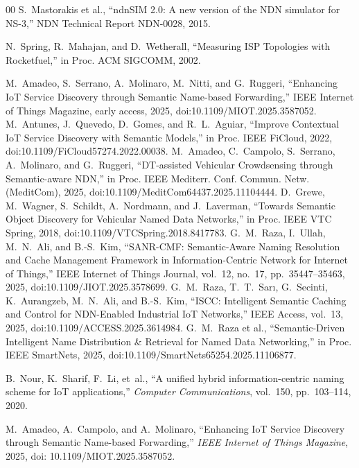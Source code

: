 \documentclass[journal]{IEEEtran}
\begin{document}
\begin{thebibliography}{00}
S.~Mastorakis et al., ``ndnSIM 2.0: A new version of the NDN simulator for NS-3,'' NDN Technical Report NDN-0028, 2015.

N.~Spring, R.~Mahajan, and D.~Wetherall, ``Measuring ISP Topologies with Rocketfuel,'' in Proc. ACM SIGCOMM, 2002.

M.~Amadeo, S.~Serrano, A.~Molinaro, M.~Nitti, and G.~Ruggeri, ``Enhancing IoT Service Discovery through Semantic Name-based Forwarding,'' IEEE Internet of Things Magazine, early access, 2025, doi:10.1109/MIOT.2025.3587052.
M.~Antunes, J.~Quevedo, D.~Gomes, and R.~L.~Aguiar, ``Improve Contextual IoT Service Discovery with Semantic Models,'' in Proc. IEEE FiCloud, 2022, doi:10.1109/FiCloud57274.2022.00038.
M.~Amadeo, C.~Campolo, S.~Serrano, A.~Molinaro, and G.~Ruggeri, ``DT-assisted Vehicular Crowdsensing through Semantic-aware NDN,'' in Proc. IEEE Mediterr. Conf. Commun. Netw. (MeditCom), 2025, doi:10.1109/MeditCom64437.2025.11104444.
D.~Grewe, M.~Wagner, S.~Schildt, A.~Nordmann, and J.~Laverman, ``Towards Semantic Object Discovery for Vehicular Named Data Networks,'' in Proc. IEEE VTC Spring, 2018, doi:10.1109/VTCSpring.2018.8417783.
G.~M.~Raza, I.~Ullah, M.~N.~Ali, and B.-S.~Kim, ``SANR-CMF: Semantic-Aware Naming Resolution and Cache Management Framework in Information-Centric Network for Internet of Things,'' IEEE Internet of Things Journal, vol.~12, no.~17, pp.~35447--35463, 2025, doi:10.1109/JIOT.2025.3578699.
G.~M.~Raza, T.~T.~Sar{\i}, G.~Secinti, K.~Aurangzeb, M.~N.~Ali, and B.-S.~Kim, ``ISCC: Intelligent Semantic Caching and Control for NDN-Enabled Industrial IoT Networks,'' IEEE Access, vol.~13, 2025, doi:10.1109/ACCESS.2025.3614984.
G.~M.~Raza et al., ``Semantic-Driven Intelligent Name Distribution \& Retrieval for Named Data Networking,'' in Proc. IEEE SmartNets, 2025, doi:10.1109/SmartNets65254.2025.11106877.

B.~Nour, K.~Sharif, F.~Li, et~al.,
``A unified hybrid information-centric naming scheme for IoT applications,''
\emph{Computer Communications}, vol.~150, pp.~103--114, 2020.

M.~Amadeo, A.~Campolo, and A.~Molinaro,
``Enhancing IoT Service Discovery through Semantic Name-based Forwarding,''
\emph{IEEE Internet of Things Magazine}, 2025, doi: 10.1109/MIOT.2025.3587052.


\end{thebibliography}
\end{document}
